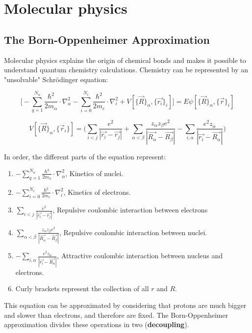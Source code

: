 \graphicspath{{chapters/07/}}
\chapter{Molecular physics}

\section{The Born-Oppenheimer Approximation}
Molecular physics explains the origin of chemical bonds and makes it possible to understand quantum chemistry calculations.
Chemistry can be represented by an "unsolvable" Schr\"odinger equation:

$$\bigg[-\sum_{q=1}^{N_{\alpha}}\frac{\hbar^2}{2m_{\alpha}}\cdot\nabla_{\alpha}^2-\sum_{i=0}^{N_e}\frac{\hbar^2}{2m_e}\cdot\nabla^2_i+V[\{\vec{R}\}_{\alpha},\{\vec{r_i}\}_i]\bigg]=E\psi[\{\vec{R}\}_{\alpha},\{\vec{r}\}_i]$$

$$V[\{\vec{R}\}_{\alpha},\{\vec{r}_i\}]=\bigg(\sum_{i<j}\frac{e^2}{|\vec{r_i}-\vec{r_j}|}+\sum_{\alpha<\beta}\frac{z_{\alpha}z_{\beta}e^2}{|\vec{R_{\alpha}}-\vec{R_{\beta}}|}-\sum_{i,\alpha}\frac{e^2z_{\alpha}}{|\vec{r_i}-\vec{R_{\alpha}}|}\bigg)$$

In order, the different parts of the equation represent:

\begin{multicols}{2}
	\begin{enumerate}
		\item $-\sum_{q=1}^{N_{\alpha}}\frac{\hbar^2}{2m_{\alpha}}\cdot\nabla_{\alpha}^2$,  Kinetics of nuclei.
		\item $-\sum_{i=0}^{N_e}\frac{\hbar^2}{2m_e}\cdot\nabla^2_i$,  Kinetics of electrons.
		\item $\sum_{i<j}\frac{e^2}{|\vec{r_i}-\vec{r_j}|}$,  Repulsive coulombic interaction between electrons
		\item $\sum_{\alpha<\beta}\frac{z_{\alpha}z_{\beta}e^2}{|\vec{R_{\alpha}}-\vec{R_{\beta}}|}$,  Repulsive coulombic interaction between nuclei.
		\item $-\sum_{i,\alpha}\frac{e^2z_{\alpha}}{|\vec{r_i}-\vec{R_{\alpha}}|}$,  Attractive coulombic interaction between nucleus and electrons.
		\item Curly brackets represent the collection of all $r$ and $R$.
	\end{enumerate}
\end{multicols}

This equation can be approximated by considering that protons are much bigger and slower than electrons, and therefore are fixed.
The Born-Oppenheimer approximation divides these operations in two (\textbf{decoupling}).

